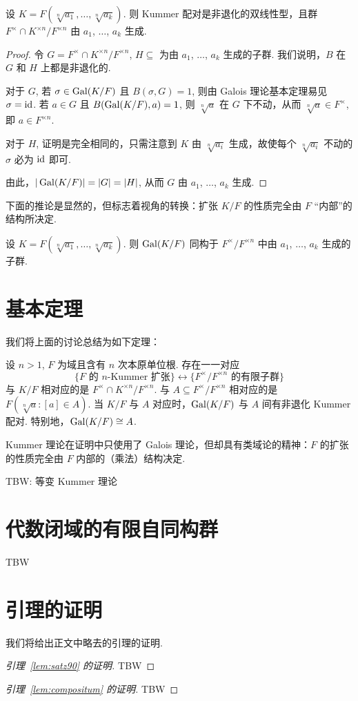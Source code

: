 \begin{thm}
  设 $K = F(\sqrt[n]{a_1}, \ldots, \sqrt[n]{a_k})$.  则 Kummer 配对是非退化的双线性型，且群 $F^\times \cap K^{\times n} / F^{\times n}$ 由 $a_1$, $\ldots$, $a_k$ 生成.
\end{thm}
\begin{proof}
  令 $G = F^\times \cap K^{\times n} / F^{\times n}$, $H \subseteq $ 为由 $a_1$, $\ldots$, $a_k$ 生成的子群.  我们说明，$B$ 在 $G$ 和 $H$ 上都是非退化的.

  对于 $G$, 若 $\sigma \in \operatorname{Gal}(K/F)$ 且 $B(\sigma, G) = 1$, 则由 Galois 理论基本定理易见 $\sigma = \operatorname{id}$.  若 $a \in G$ 且 $B(\operatorname{Gal}(K/F), a) = 1$, 则 $\sqrt[n]{a}$ 在 $G$ 下不动，从而 $\sqrt[n]{a} \in F^\times$, 即 $a \in F^{\times n}$.

  对于 $H$, 证明是完全相同的，只需注意到 $K$ 由 $\sqrt[n]{a_i}$ 生成，故使每个 $\sqrt[n]{a_i}$ 不动的 $\sigma$ 必为 $\operatorname{id}$ 即可.

  由此，$|\operatorname{Gal}(K/F)| = |G| = |H|$, 从而 $G$ 由 $a_1$, $\ldots$, $a_k$ 生成.
\end{proof}
下面的推论是显然的，但标志着视角的转换：扩张 $K/F$ 的性质完全由 $F$ “内部”的结构所决定.
\begin{cor}
  设 $K = F(\sqrt[n]{a_1}, \ldots, \sqrt[n]{a_k})$.  则 $\operatorname{Gal}(K/F)$ 同构于 $F^\times / F^{\times n}$ 中由 $a_1$, $\ldots$, $a_k$ 生成的子群.
\end{cor}

\section{基本定理}
我们将上面的讨论总结为如下定理：
\begin{thm}
  设 $n > 1$, $F$ 为域且含有 $n$ 次本原单位根.  存在一一对应
  \[ \{ F \text{ 的\ } n \text{-Kummer 扩张} \} \leftrightarrow \{F^\times / F^{\times n} \text{ 的有限子群}\} \]
  与 $K/F$ 相对应的是 $F^\times \cap K^{\times n} / F^{\times n}$.  与 $A \subseteq F^\times / F^{\times n}$ 相对应的是 $F(\sqrt[n]{a} \colon [a] \in A)$.  当 $K/F$ 与 $A$ 对应时，$\operatorname{Gal}(K/F)$ 与 $A$ 间有非退化 Kummer 配对.  特别地，$\operatorname{Gal}(K/F) \cong A$.
\end{thm}

Kummer 理论在证明中只使用了 Galois 理论，但却具有类域论的精神：$F$ 的扩张的性质完全由 $F$ 内部的（乘法）结构决定.

TBW: 等变 Kummer 理论

\section{代数闭域的有限自同构群}
TBW

\section*{引理的证明}
我们将给出正文中略去的引理的证明.
\begin{proof}[引理~\ref{lem:satz90} 的证明]
  TBW
\end{proof}

\begin{proof}[引理~\ref{lem:compositum} 的证明]
  TBW
\end{proof}
